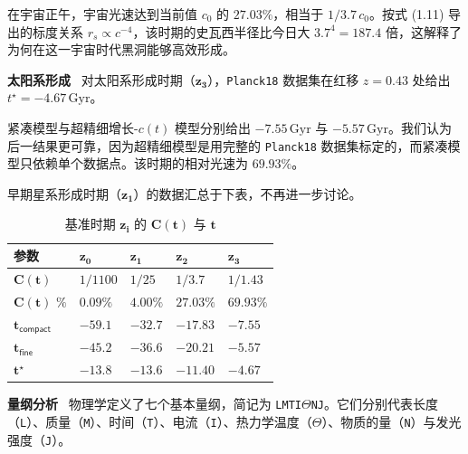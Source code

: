 \documentclass[12pt,leqno]{article}
\begin{document}
	\medskip
	在宇宙正午，宇宙光速达到当前值 $c_0$ 的 $27.03\%$，相当于 $1/3.7\,c_0$。按式 (1.11) 导出的标度关系 $r_s \propto c^{-4}$，该时期的史瓦西半径比今日大 $3.7^4 = 187.4$ 倍，这解释了为何在这一宇宙时代黑洞能够高效形成。

		
	\bigskip
	{\bf 太阳系形成}\,\,\,
	对太阳系形成时期（$\boldsymbol{z_3}$），\texttt{Planck18} 数据集在红移 $z=0.43$ 处给出 $t^\star = -4.67\,\mathrm{Gyr}$。
	
	\medskip
	紧凑模型与超精细增长-$c(t)$ 模型分别给出 $-7.55\,\mathrm{Gyr}$ 与 $-5.57\,\mathrm{Gyr}$。我们认为后一结果更可靠，因为超精细模型是用完整的 \texttt{Planck18} 数据集标定的，而紧凑模型只依赖单个数据点。该时期的相对光速为 $69.93\%$。
	
	\medskip
	早期星系形成时期（$\boldsymbol{z_1}$）的数据汇总于下表，不再进一步讨论。
	
	\bigskip
	\begin{table}[H]
		\centering
		\captionsetup{skip=2pt, font=small}
		\caption{基准时期 $\boldsymbol{z_i}$ 的 $\boldsymbol{C(t)}$ 与 $\boldsymbol{t}$}
		\footnotesize
		\renewcommand{\arraystretch}{1.50}
		\begin{tabular}{>{\centering\arraybackslash}p{2.5cm}|>{\centering\arraybackslash}p{2cm}>{\centering\arraybackslash}p{2cm}|>{\centering\arraybackslash}p{2cm}>{\centering\arraybackslash}p{2cm}}
			\toprule
			\textbf{参数} & \textbf{$\boldsymbol{z_0}$} & \textbf{$\boldsymbol{z_1}$} & \textbf{$\boldsymbol{z_2}$} & \textbf{$\boldsymbol{z_3}$} \\
			\midrule
			$\boldsymbol{C(t)}$                     & $1/1100$    & $1/25$    & $1/3.7$   & $1/1.43$   \\
			$\boldsymbol{C(t)\,\,\%}$               & $0.09\%$    & $4.00\%$  & $27.03\%$ & $69.93\%$  \\
			$\boldsymbol{t}\mathsf{_{compact}}$     & $-59.1$     & $-32.7$   & $-17.83$  & $-7.55$    \\
			$\boldsymbol{t}\mathsf{_{fine}}$        & $-45.2$     & $-36.6$   & $-20.21$  & $-5.57$    \\
			$\boldsymbol{t^\star}$                  & $-13.8$     & $-13.6$   & $-11.40$  & $-4.67$    \\
			\bottomrule
		\end{tabular}
	\end{table}
	
	
	
	\medskip
	{\bf 量纲分析}\,\,\,
	物理学定义了七个基本量纲，简记为 \texttt{LMTI$\Theta$NJ}。它们分别代表长度（\texttt{L}）、质量（\texttt{M}）、时间（\texttt{T}）、电流（\texttt{I}）、热力学温度（\texttt{$\Theta$}）、物质的量（\texttt{N}）与发光强度（\texttt{J}）。
	
\end{document}
